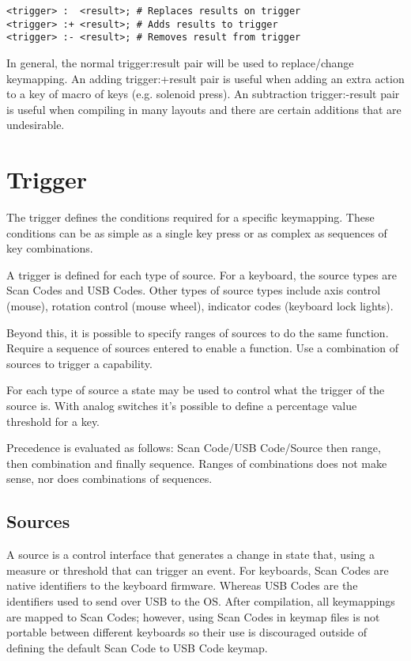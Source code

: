 \documentclass{kiibohd-template}
\begin{document}
\begin{lstlisting}
<trigger> :  <result>; # Replaces results on trigger
<trigger> :+ <result>; # Adds results to trigger
<trigger> :- <result>; # Removes result from trigger
\end{lstlisting}

In general, the normal trigger:result pair will be used to replace/change keymapping.
An adding trigger:+result pair is useful when adding an extra action to a key of macro of keys (e.g. solenoid press).
An subtraction trigger:-result pair is useful when compiling in many layouts and there are certain additions that are undesirable.


\section{Trigger}

The trigger defines the conditions required for a specific keymapping.
These conditions can be as simple as a single key press or as complex as sequences of key combinations.

A trigger is defined for each type of source.
For a keyboard, the source types are Scan Codes and USB Codes.
Other types of source types include axis control (mouse), rotation control (mouse wheel), indicator codes (keyboard lock lights).

Beyond this, it is possible to specify ranges of sources to do the same function.
Require a sequence of sources entered to enable a function.
Use a combination of sources to trigger a capability.

For each type of source a state may be used to control what the trigger of the source is.
With analog switches it's possible to define a percentage value threshold for a key.

Precedence is evaluated as follows: Scan Code/USB Code/Source then range, then combination and finally sequence.
Ranges of combinations does not make sense, nor does combinations of sequences.


\subsection{Sources}

A source is a control interface that generates a change in state that, using a measure or threshold that can trigger an event.
For keyboards, Scan Codes are native identifiers to the keyboard firmware.
Whereas USB Codes are the identifiers used to send over USB to the OS.
After compilation, all keymappings are mapped to Scan Codes; however, using Scan Codes in keymap files is not portable between different keyboards so their use is discouraged outside of defining the default Scan Code to USB Code keymap.
\end{document}
